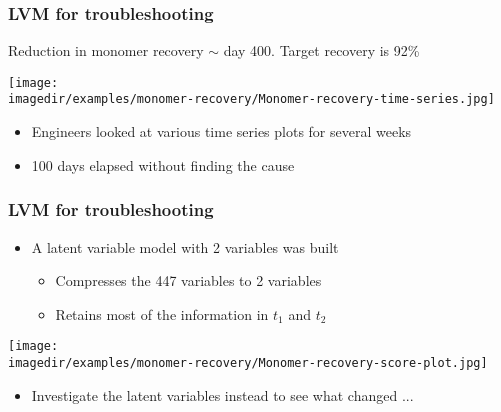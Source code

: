 \begin{frame}\frametitle{LVM for troubleshooting}
	Reduction in monomer recovery $\sim$ day 400. Target recovery is 92\%
	\begin{center}
		\texttt{[image: \\imagedir/examples/monomer-recovery/Monomer-recovery-time-series.jpg]}
	\end{center}
	
	\begin{itemize}
		\item	Engineers looked at various time series plots for several weeks
		\item	100 days elapsed without finding the cause
	\end{itemize}
\end{frame}

\begin{frame}\frametitle{LVM for troubleshooting}
	\begin{itemize}
		\item	A latent variable model with 2 variables was built
		\begin{itemize}
			\item	Compresses the 447 variables to 2 variables
			\item	Retains most of the information in $t_1$ and $t_2$
		\end{itemize}
	\end{itemize}

	\texttt{[image: \\imagedir/examples/monomer-recovery/Monomer-recovery-score-plot.jpg]}
	\begin{itemize}
		\item	Investigate the latent variables instead to see what changed ...
	\end{itemize}
\end{frame}

